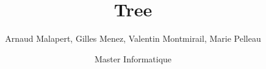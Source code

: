 \documentclass{beamer}
\title{Tree}
\author[]{Arnaud Malapert, Gilles Menez, Valentin Montmirail, Marie Pelleau}
\date[2018 - 2019]{Master Informatique}
\begin{document}
\frame{
  \titlepage
}
\end{document}
